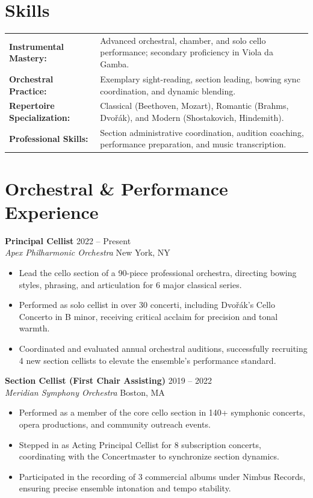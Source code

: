 \documentclass[10pt,letterpaper]{article}
\begin{document}
\section*{Skills}
\begin{tabularx}{\textwidth}{@{}l X@{}}
    \textbf{Instrumental Mastery:} & Advanced orchestral, chamber, and solo cello performance; secondary proficiency in Viola da Gamba. \\
    \textbf{Orchestral Practice:} & Exemplary sight-reading, section leading, bowing sync coordination, and dynamic blending. \\
    \textbf{Repertoire Specialization:} & Classical (Beethoven, Mozart), Romantic (Brahms, Dvořák), and Modern (Shostakovich, Hindemith). \\
    \textbf{Professional Skills:} & Section administrative coordination, audition coaching, performance preparation, and music transcription. \\
\end{tabularx}

\section*{Orchestral \& Performance Experience}

\textbf{Principal Cellist} \hfill 2022 -- Present \\
\textit{Apex Philharmonic Orchestra} \hfill New York, NY
\begin{itemize}[leftmargin=1.2em, nosep, topsep=1pt]
    \item Lead the cello section of a 90-piece professional orchestra, directing bowing styles, phrasing, and articulation for 6 major classical series.
    \item Performed as solo cellist in over 30 concerti, including Dvořák's Cello Concerto in B minor, receiving critical acclaim for precision and tonal warmth.
    \item Coordinated and evaluated annual orchestral auditions, successfully recruiting 4 new section cellists to elevate the ensemble's performance standard.
\end{itemize}

\vspace{0.4em}

\textbf{Section Cellist (First Chair Assisting)} \hfill 2019 -- 2022 \\
\textit{Meridian Symphony Orchestra} \hfill Boston, MA
\begin{itemize}[leftmargin=1.2em, nosep, topsep=1pt]
    \item Performed as a member of the core cello section in 140+ symphonic concerts, opera productions, and community outreach events.
    \item Stepped in as Acting Principal Cellist for 8 subscription concerts, coordinating with the Concertmaster to synchronize section dynamics.
    \item Participated in the recording of 3 commercial albums under Nimbus Records, ensuring precise ensemble intonation and tempo stability.
\end{itemize}
\end{document}
